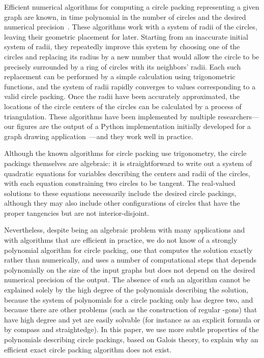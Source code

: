 \documentclass[oribibl,10pt]{llncs}
\begin{document}
\begin{appendix}
Efficient numerical algorithms for computing a circle packing representing a given graph are known, in time polynomial in the number of circles and the desired numerical precision~. These algorithms work with a system of radii of the circles, leaving their geometric placement for later. Starting from an inaccurate initial system of radii, they repeatedly improve this system by choosing one of the circles and replacing its radius by a new number that would allow the circle to be precisely surrounded by a ring of circles with its neighbors' radii. Each such replacement can be performed by a simple calculation using trigonometric functions, and the system of radii rapidly converges to values corresponding to a valid circle packing. Once the radii have been accurately approximated, the locations of the circle centers of the circles can be calculated by a process of triangulation. These algorithms have been implemented by multiple researchers---our figures are the output of a Python implementation initially developed for a graph drawing application~---and they work well in practice.

Although the known algorithms for circle packing use trigonometry, the circle packings themselves are algebraic: it is straightforward to write out a system of quadratic equations for variables describing the centers and radii of the circles, with each equation constraining two circles to be tangent.  The real-valued solutions to these equations necessarily include the desired circle packings, although they may also include other configurations of circles that have the proper tangencies but are not interior-disjoint.

Nevertheless, despite being an algebraic problem with many applications and with algorithms that are efficient in practice, we do not know of a strongly polynomial algorithm for circle packing, one that computes the solution exactly rather than numerically, and uses a number of computational steps that depends polynomially on the size of the input graphs but does not depend on the desired numerical precision of the output. The absence of such an algorithm cannot be explained solely by the high degree of the polynomials describing the solution, because the system of polynomials for a circle packing only has degree two, and because there are other problems (such as the construction of regular -gons) that  have high degree and yet are easily solvable (for instance as an explicit formula or by compass and straightedge). In this paper, we use more subtle properties of the polynomials describing circle packings, based on Galois theory, to explain why an efficient exact circle packing algorithm does not exist.


\end{appendix}
\end{document}
